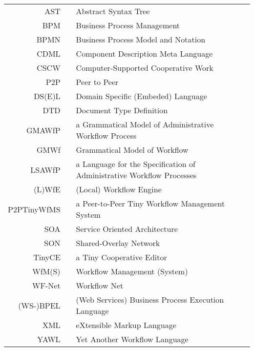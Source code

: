 \begin{center}
	\begin{tabular}[t]{rp{5mm}p{10cm}}
		AST & & Abstract Syntax Tree \\
		BPM & & Business Process Management \\
		BPMN & & Business Process Model and Notation \\
		CDML & & Component Description Meta Language \\
		CSCW & & Computer-Supported Cooperative Work \\
		P2P & & Peer to Peer \\
		DS(E)L & & Domain Specific (Embeded) Language \\
		DTD & & Document Type Definition \\
		GMAWfP & & a Grammatical Model of Administrative Workflow Process \\
		GMWf & & Grammatical Model of Workflow \\
		LSAWfP & & a Language for the Specification of Administrative Workflow Processes \\
		(L)WfE & & (Local) Workflow Engine \\
		P2PTinyWfMS & & a Peer-to-Peer Tiny Workflow Management System \\
		SOA & & Service Oriented Architecture \\
		SON & & Shared-Overlay Network \\
		TinyCE & & a Tiny Cooperative Editor \\
		WfM(S) & & Workflow Management (System) \\
		WF-Net & & Workflow Net \\
		(WS-)BPEL & & (Web Services) Business Process Execution Language \\
		XML & & eXtensible Markup Language \\
		YAWL & & Yet Another Workflow Language \\
	\end{tabular}
\end{center}

